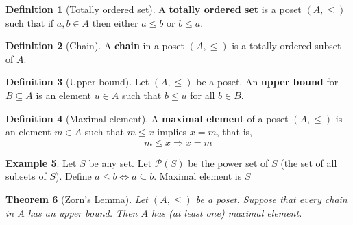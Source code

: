 \documentclass[10pt, oneside, reqno]{amsart}
\theoremstyle{plain}%
\newtheorem{thm}{Theorem}[section]
\theoremstyle{definition}
\newtheorem{defn}[thm]{Definition}
\newtheorem{exmp}[thm]{Example}
\theoremstyle{remark}
\begin{document}
\begin{defn}[Totally ordered set]
	A \textbf{totally ordered set} is a poset $(A, \leq)$ such that if $a, b \in A$ then either $a \leq b$ or $b \leq a$.
\end{defn}

\begin{defn}[Chain]
	A \textbf{chain} in a poset $(A, \leq)$ is a totally ordered subset of $A$.
\end{defn}

\begin{defn}[Upper bound]
	Let $(A, \leq)$ be a poset.  An \textbf{upper bound} for $B \subseteq A$ is an element $u \in A$ such that $b \leq u$ for all $ b \in B$.  
\end{defn}

\begin{defn}[Maximal element]
	A \textbf{maximal element} of a poset $(A, \leq)$ is an element $m \in A$ such that $m \leq x$ implies $x = m$, that is, \[
		m \leq x \Rightarrow x = m
	\]
\end{defn}

\begin{exmp}
	Let $S$ be any set.  Let $\mathcal{P}(S)$ be the power set of $S$ (the set of all subsets of $S$).  Define $a \leq b \iff a \subseteq b$.  Maximal element is $S$
\end{exmp}

\begin{thm}[Zorn's Lemma]
	Let $(A, \leq)$ be a poset.  Suppose that every chain in $A$ has an upper bound.  Then $A$ has (at least one) maximal element.  
\end{thm}
\end{document}
